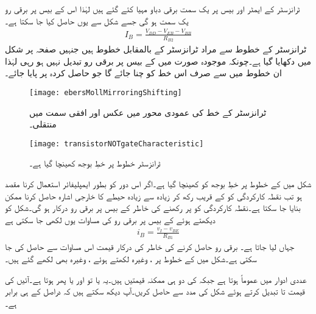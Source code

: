 ٹرانزسٹر  کے ایمٹر اور بیس پر یک سمت برقی دباو مہیا کئے گئے ہیں لہٰذا  اس کے بیس پر برقی رو  یک سمت ہو گی جسے شکل سے یوں حاصل کیا جا سکتا ہے۔
\begin{align*}
I_{B}=\frac{V_{DD}-V_{EB}-V_{BB}}{R_{B2}}
\end{align*}
ٹرانزسٹر  کے  خطوط سے مراد  ٹرانزسٹر  کے  بالمقابل  خطوط ہیں جنہیں صفحہ  پر شکل  میں دکھایا گیا ہے۔چونکہ موجودہ  صورت میں  کے بیس پر برقی رو تبدیل نہیں ہو رہی لہٰذا ان خطوط میں سے صرف اس خط کو چنا جائے گا جو حاصل کردہ   پر پایا جائے۔
\begin{figure}
\centering
\texttt{[image: ebersMollMirroringShifting]}
\caption{ٹرانزسٹر کے خط کی عمودی محور میں عکس اور افقی سمت میں منتقلی۔}
\label{شکل_ٹرانزسٹر_خط_عمودی_عکس_افقی_منتقلی}
\end{figure}
%
\begin{figure}
\centering
\texttt{[image: transistorNOTgateCharacteristic]}
\caption{ٹرانزسٹر خطوط پر خطِ بوجھ کھینچا گیا ہے۔}
\label{شکل_ٹرانزسٹر_خطوط_پر_بار_کا_خط}
\end{figure}

شکل  میں  کے خطوط پر خطِ بوجھ  کو کھینچا گیا ہے۔اگر اس دور کو بطور ایمپلیفائر استعمال کرنا مقصد ہو تب نقطہ کارکردگی کو  کے قریب رکھ کر زیادہ سے زیادہ حیطے کا خارجی اشارہ حاصل کرنا ممکن بنایا جا سکتا ہے۔نقطہ کارکردگی کو  پر رکھنے کی خاطر  کے بیس پر  برقی رو درکار ہو گی۔شکل  کو دیکھتے ہوئے  کے بیس پر برقی رو کی مساوات یوں لکھی جا سکتی ہے
\begin{align*}
i_B=\frac{v_I-v_{BE}}{R_{B1}}
\end{align*}
جہاں  لیا جاتا ہے۔ برقی رو حاصل کرنے کی خاطر  کی درکار قیمت  اس مساوات سے حاصل کی جا سکتی ہے۔شکل  میں  کے خطوط  پر ،  وغیرہ لکھتے ہوئے ،  وغیرہ بھی  لکھے گئے ہیں۔

عددی ادوار میں عموماً  ہوتا ہے جبکہ  کی دو ہی ممکنہ قیمتیں ہیں۔یہ یا تو  اور  یا پھر  ہوتا ہے۔آئیں  کی قیمت  تا  تبدیل کرتے ہوئے شکل  کی مدد سے   حاصل کریں۔آپ دیکھ سکتے ہیں کہ  دراصل  کے ہی برابر ہے۔

